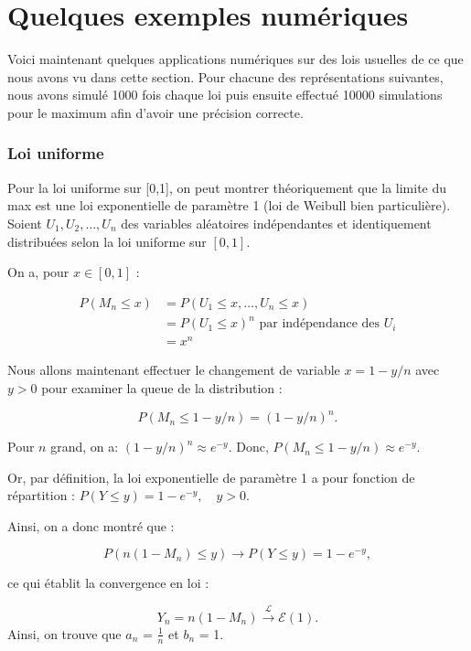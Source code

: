 \documentclass{article}
\begin{document}
\section{Quelques exemples numériques}

\noindent Voici maintenant quelques applications numériques sur des lois usuelles de ce que nous avons vu dans cette section. Pour chacune des représentations suivantes, nous avons simulé 1000 fois chaque loi puis ensuite effectué 10000 simulations pour le maximum afin d'avoir une précision correcte. 

\subsubsection{Loi uniforme}

\noindent Pour la loi uniforme sur [0,1], on peut montrer théoriquement que la limite du max est une loi exponentielle de paramètre 1 (loi de Weibull bien particulière). \\
\noindent Soient \( U_1, U_2, \dots, U_n \) des variables aléatoires indépendantes et identiquement distribuées selon la loi uniforme sur \([0,1]\).

\noindent On a, pour $ x \in [0,1]$ :

\begin{align*}
	P(M_n \leq x) &= P(U_1 \leq x, \dots, U_n \leq x) \\
	&= P(U_1 \leq x)^n \text{ par indépendance des $U_i$}\\
	&= x^n
\end{align*}

\noindent Nous allons maintenant effectuer le changement de variable $ x = 1 - y/n $ avec $y > 0 $ pour examiner la queue de la distribution :

\[
P(M_n \leq 1 - y/n) = (1 - y/n)^n.
\]

\noindent Pour $ n $ grand, on a: $(1 - y/n)^n \approx e^{-y} $. Donc, $ P(M_n \leq 1 - y/n) \approx e^{-y} $.


\noindent Or, par définition, la loi exponentielle de paramètre 1 a pour fonction de répartition : $ P(Y \leq y) = 1 - e^{-y}, \quad y > 0. $

\noindent Ainsi, on a donc montré que :

\[
P(n(1 - M_n) \leq y) \to P(Y \leq y) = 1 - e^{-y},
\]

\noindent ce qui établit la convergence en loi :

\[
Y_n = n(1 - M_n) \xrightarrow{\mathcal{L}} \mathcal{E}(1).
\] 
\noindent Ainsi, on trouve que $a_n$ = $\frac{1}{n}$ et $b_n$ = 1.
\end{document}
